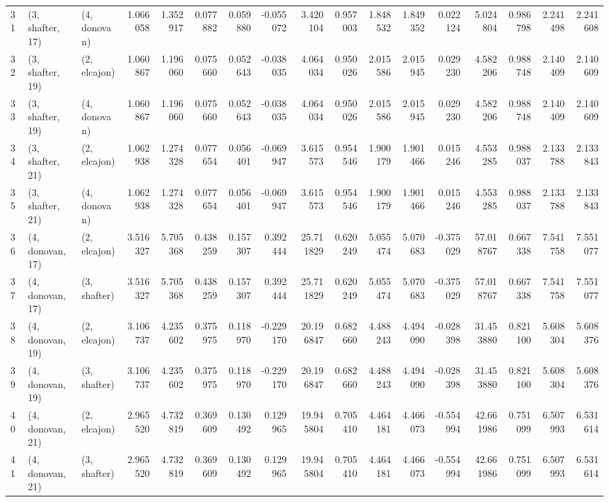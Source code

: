 \begin{tabular}{lllrrrrrrrrrrrrrr}
31 &  (3, shafter, 17) &     (4, donovan) &  1.066058 &  1.352917 &   0.077882 &  0.059880 & -0.055072 &   3.420104 &  0.957003 &   1.848532 &  1.849352 &  0.022124 &   5.024804 &  0.986798 &  2.241498 &  2.241608 \\
32 &  (3, shafter, 19) &     (2, elcajon) &  1.060867 &  1.196060 &   0.075660 &  0.052643 & -0.038035 &   4.064034 &  0.950026 &   2.015586 &  2.015945 &  0.029230 &   4.582206 &  0.988748 &  2.140409 &  2.140609 \\
33 &  (3, shafter, 19) &     (4, donovan) &  1.060867 &  1.196060 &   0.075660 &  0.052643 & -0.038035 &   4.064034 &  0.950026 &   2.015586 &  2.015945 &  0.029230 &   4.582206 &  0.988748 &  2.140409 &  2.140609 \\
34 &  (3, shafter, 21) &     (2, elcajon) &  1.062938 &  1.274328 &   0.077654 &  0.056401 & -0.069947 &   3.615573 &  0.954546 &   1.900179 &  1.901466 &  0.015246 &   4.553285 &  0.988037 &  2.133788 &  2.133843 \\
35 &  (3, shafter, 21) &     (4, donovan) &  1.062938 &  1.274328 &   0.077654 &  0.056401 & -0.069947 &   3.615573 &  0.954546 &   1.900179 &  1.901466 &  0.015246 &   4.553285 &  0.988037 &  2.133788 &  2.133843 \\
36 &  (4, donovan, 17) &     (2, elcajon) &  3.516327 &  5.705368 &   0.438259 &  0.157307 &  0.392444 &  25.711829 &  0.620249 &   5.055474 &  5.070683 & -0.375029 &  57.018767 &  0.667338 &  7.541758 &  7.551077 \\
37 &  (4, donovan, 17) &     (3, shafter) &  3.516327 &  5.705368 &   0.438259 &  0.157307 &  0.392444 &  25.711829 &  0.620249 &   5.055474 &  5.070683 & -0.375029 &  57.018767 &  0.667338 &  7.541758 &  7.551077 \\
38 &  (4, donovan, 19) &     (2, elcajon) &  3.106737 &  4.235602 &   0.375975 &  0.118970 & -0.229170 &  20.196847 &  0.682660 &   4.488243 &  4.494090 & -0.028398 &  31.453880 &  0.821100 &  5.608304 &  5.608376 \\
39 &  (4, donovan, 19) &     (3, shafter) &  3.106737 &  4.235602 &   0.375975 &  0.118970 & -0.229170 &  20.196847 &  0.682660 &   4.488243 &  4.494090 & -0.028398 &  31.453880 &  0.821100 &  5.608304 &  5.608376 \\
40 &  (4, donovan, 21) &     (2, elcajon) &  2.965520 &  4.732819 &   0.369609 &  0.130492 &  0.129965 &  19.945804 &  0.705410 &   4.464181 &  4.466073 & -0.554994 &  42.661986 &  0.751099 &  6.507993 &  6.531614 \\
41 &  (4, donovan, 21) &     (3, shafter) &  2.965520 &  4.732819 &   0.369609 &  0.130492 &  0.129965 &  19.945804 &  0.705410 &   4.464181 &  4.466073 & -0.554994 &  42.661986 &  0.751099 &  6.507993 &  6.531614 \\

\end{tabular}

